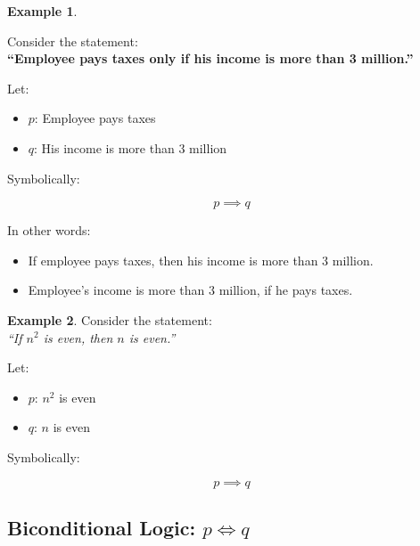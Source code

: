 \documentclass[
]{book}
\providecommand{\tightlist}{%
  \setlength{\itemsep}{0pt}\setlength{\parskip}{0pt}}
\theoremstyle{definition}
\theoremstyle{definition}
\newtheorem{example}{Example}[chapter]
\theoremstyle{definition}
\theoremstyle{definition}
\theoremstyle{remark}
\begin{document}
\begin{example}
\protect\hypertarget{exm:unnamed-chunk-24}{}\label{exm:unnamed-chunk-24}

Consider the statement:\\
\textbf{``Employee pays taxes only if his income is more than 3 million.''}

Let:

\begin{itemize}
\tightlist
\item
  \(p\): Employee pays taxes\\
\item
  \(q\): His income is more than 3 million
\end{itemize}

Symbolically:

\[
p \implies q
\]

In other words:

\begin{itemize}
\tightlist
\item
  If employee pays taxes, then his income is more than 3 million.
\item
  Employee's income is more than 3 million, if he pays taxes.
\end{itemize}

\end{example}

\begin{example}
\protect\hypertarget{exm:unnamed-chunk-25}{}\label{exm:unnamed-chunk-25}Consider the statement:\\
\emph{``If \(n^2\) is even, then \(n\) is even.''}

Let:

\begin{itemize}
\tightlist
\item
  \(p\): \(n^2\) is even\\
\item
  \(q\): \(n\) is even
\end{itemize}

Symbolically:

\[
p \implies q
\]
\end{example}

\subsection{\texorpdfstring{Biconditional Logic: \(p \iff q\)}{Biconditional Logic: p \textbackslash iff q}}\label{biconditional-logic-p-iff-q}
\end{document}
